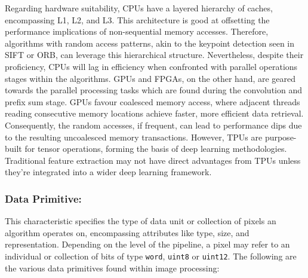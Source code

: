 Regarding hardware suitability, CPUs have a layered hierarchy of caches, encompassing L1, L2, and L3. This architecture is good at offsetting the performance implications of non-sequential memory accesses. Therefore, algorithms with random access patterns, akin to the keypoint detection seen in SIFT or ORB, can leverage this hierarchical structure. Nevertheless, despite their proficiency, CPUs will lag in efficiency when confronted with parallel operations stages within the algorithms. GPUs and FPGAs, on the other hand, are geared towards the parallel processing tasks which are found during the convolution and  prefix sum stage. GPUs favour coalesced memory access, where adjacent threads reading consecutive memory locations achieve faster, more efficient data retrieval. Consequently, the random accesses, if frequent, can lead to performance dips due to the resulting uncoalesced memory transactions. However, TPUs are purpose-built for tensor operations, forming the basis of deep learning methodologies. Traditional feature extraction may not have direct advantages from TPUs unless they're integrated into a wider deep learning framework. 



\subsubsection{Data Primitive:}
This characteristic specifies the type of data unit or collection of pixels an algorithm operates on, encompassing attributes like type, size, and representation. Depending on the level of the pipeline, a pixel may refer to an individual or collection of bits of type \texttt{word},  \texttt{uint8} or \texttt{uint12}. The following are the various data primitives found within image processing:

